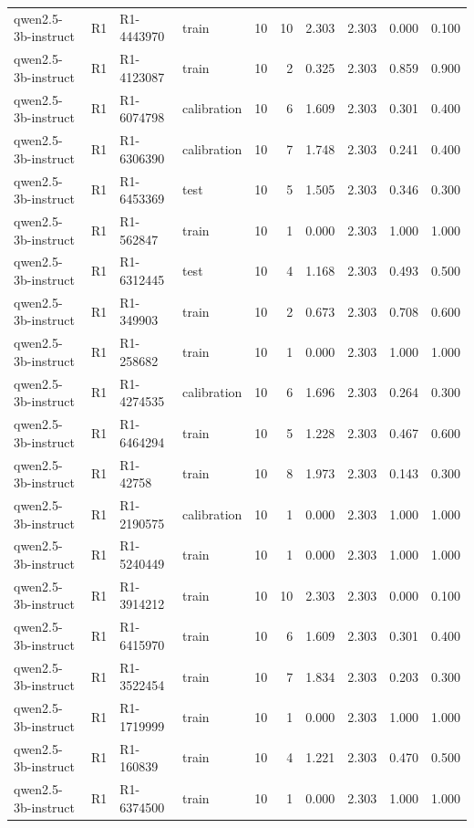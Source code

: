 \begin{table}
\begin{tabular}{llllrrrrrr}
qwen2.5-3b-instruct & R1 & R1-4443970 & train & 10 & 10 & 2.303 & 2.303 & 0.000 & 0.100 \\
qwen2.5-3b-instruct & R1 & R1-4123087 & train & 10 & 2 & 0.325 & 2.303 & 0.859 & 0.900 \\
qwen2.5-3b-instruct & R1 & R1-6074798 & calibration & 10 & 6 & 1.609 & 2.303 & 0.301 & 0.400 \\
qwen2.5-3b-instruct & R1 & R1-6306390 & calibration & 10 & 7 & 1.748 & 2.303 & 0.241 & 0.400 \\
qwen2.5-3b-instruct & R1 & R1-6453369 & test & 10 & 5 & 1.505 & 2.303 & 0.346 & 0.300 \\
qwen2.5-3b-instruct & R1 & R1-562847 & train & 10 & 1 & 0.000 & 2.303 & 1.000 & 1.000 \\
qwen2.5-3b-instruct & R1 & R1-6312445 & test & 10 & 4 & 1.168 & 2.303 & 0.493 & 0.500 \\
qwen2.5-3b-instruct & R1 & R1-349903 & train & 10 & 2 & 0.673 & 2.303 & 0.708 & 0.600 \\
qwen2.5-3b-instruct & R1 & R1-258682 & train & 10 & 1 & 0.000 & 2.303 & 1.000 & 1.000 \\
qwen2.5-3b-instruct & R1 & R1-4274535 & calibration & 10 & 6 & 1.696 & 2.303 & 0.264 & 0.300 \\
qwen2.5-3b-instruct & R1 & R1-6464294 & train & 10 & 5 & 1.228 & 2.303 & 0.467 & 0.600 \\
qwen2.5-3b-instruct & R1 & R1-42758 & train & 10 & 8 & 1.973 & 2.303 & 0.143 & 0.300 \\
qwen2.5-3b-instruct & R1 & R1-2190575 & calibration & 10 & 1 & 0.000 & 2.303 & 1.000 & 1.000 \\
qwen2.5-3b-instruct & R1 & R1-5240449 & train & 10 & 1 & 0.000 & 2.303 & 1.000 & 1.000 \\
qwen2.5-3b-instruct & R1 & R1-3914212 & train & 10 & 10 & 2.303 & 2.303 & 0.000 & 0.100 \\
qwen2.5-3b-instruct & R1 & R1-6415970 & train & 10 & 6 & 1.609 & 2.303 & 0.301 & 0.400 \\
qwen2.5-3b-instruct & R1 & R1-3522454 & train & 10 & 7 & 1.834 & 2.303 & 0.203 & 0.300 \\
qwen2.5-3b-instruct & R1 & R1-1719999 & train & 10 & 1 & 0.000 & 2.303 & 1.000 & 1.000 \\
qwen2.5-3b-instruct & R1 & R1-160839 & train & 10 & 4 & 1.221 & 2.303 & 0.470 & 0.500 \\
qwen2.5-3b-instruct & R1 & R1-6374500 & train & 10 & 1 & 0.000 & 2.303 & 1.000 & 1.000 \\

\end{tabular}
\end{table}

